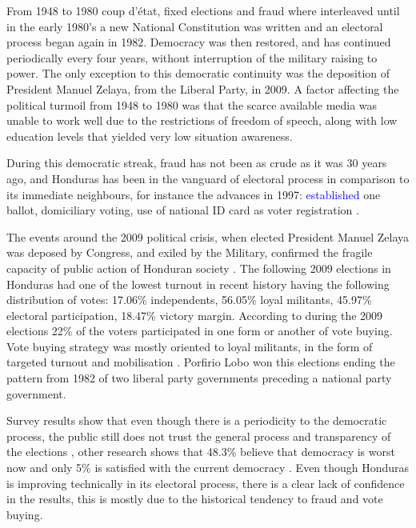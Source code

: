\documentclass[letterpaper,10pt]{article}
\begin{document}
From 1948 to 1980 coup d'\'{e}tat, fixed elections and fraud where interleaved until in the early 1980's a new National Constitution was written and an electoral process began again in 1982. Democracy was then restored, and has continued periodically every four years, without interruption of the military raising to power. The only exception to this democratic continuity was the deposition of President Manuel Zelaya, from the Liberal Party, in 2009. A factor affecting the political turmoil from 1948 to 1980 was that the scarce available media was unable to work well due to the restrictions of freedom of speech, along with low education levels that yielded very low situation awareness.

During this democratic streak, fraud has not been as crude as it was 30 years ago, and Honduras has been in the vanguard of electoral process in comparison to its immediate neighbours, for instance the advances in 1997: \textcolor{blue}{established} one ballot, domiciliary voting, use of national ID card as voter registration \citep{romero2014}.

The events around the 2009 political crisis, when elected President Manuel Zelaya was deposed by Congress, and exiled by the Military, confirmed the fragile capacity of public action of Honduran society \citep{romero2014}. The following 2009 elections in Honduras had one of the lowest turnout in recent history having the following distribution of votes: 17.06\% independents, 56.05\% loyal militants, 45.97\% electoral participation, 18.47\% victory margin. According to \cite{gonza2014} during the 2009 elections 22\% of the voters participated in one form or another of vote buying. Vote buying strategy was mostly oriented to loyal militants, in the form of targeted turnout and mobilisation \citep{gonza2014}. Porfirio Lobo won this elections ending the pattern from 1982 of two liberal party governments preceding a national party government.

Survey results show that even though there is a periodicity to the democratic process, the public still does not trust the general process and transparency of the elections \citep{romero2014}, other research shows that 48.3\% believe that democracy is worst now and only 5\% is satisfied with the current democracy \citep{latinbar}. Even though Honduras is improving technically in its electoral process, there is a clear lack of confidence in the results, this is mostly due to the historical tendency to fraud and vote buying.
\end{document}
